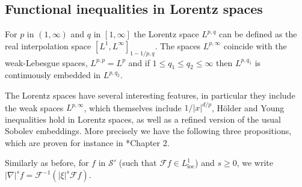 \documentclass[12pt]{article}
\theoremstyle{plain}
\begin{document}
\subsection{Functional inequalities in Lorentz spaces }
\label{subsec:Lorentz-ineq}
For $p$ in $(1,\infty)$ and $q$ in $[1,\infty]$ the Lorentz space $L^{p,q}$ can be defined as the real interpolation space $[L^1,L^\infty]_{1-1/p,q}$. The spaces $L^{p,\infty}$ coincide with the weak-Lebesgue spaces, $L^{p,p}=L^p$ and if $1\leq q_1\leq q_2\leq\infty$ then $L^{p,q_1}$ is continuously embedded in $L^{p,q_2}$.

The Lorentz spaces have several interesting features, in particular they include the weak spaces $L^{p,\infty}$, which themselves include $1/|x|^{d/p}$,
Hölder and Young inequalities hold in Lorentz spaces, as well as a refined version of the usual Sobolev embeddings. More precisely we have the following three propositions, which are proven for instance in \cite{LemarieRieusset}*{Chapter 2}.


Similarly as before, for $f$ in $\mathcal{S}'$ (such that $\mathcal{F}f\in L^1_{\mathrm{loc}}$) and $s\ge0$, we write $|\nabla|^s f = \mathcal{F}^{-1}(|\xi|^s \mathcal{F} f)$. 
\end{document}
